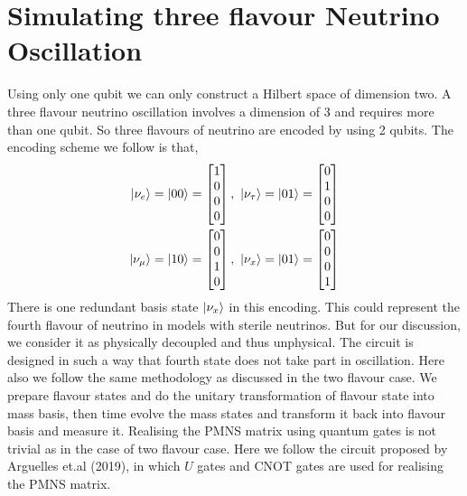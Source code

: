 \documentclass[12pt,a4paper]{report}
\begin{document}
\section{Simulating three flavour Neutrino Oscillation}\label{3FO}
Using only one qubit we can only construct a Hilbert space of dimension two. A three flavour neutrino oscillation involves a dimension of 3 and requires more than one qubit. So three flavours of neutrino are encoded by using 2 qubits. The encoding scheme we follow is that,
\begin{equation}
\label{eq:17}
\begin{split}
\ket{\nu_{e}}& = \ket{00} = \begin{bmatrix} 1\\0\\0\\0 \end{bmatrix}, \ \ket{\nu_{\tau}} = \ket{01} = \begin{bmatrix} 0\\1\\0\\0 \end{bmatrix} \\
\ket{\nu_{\mu}}&=\ket{10}=\begin{bmatrix} 0\\0\\1\\0 \end{bmatrix}, \ \ket{\nu_{x}} = \ket{01} = \begin{bmatrix} 0\\0\\0\\1 \end{bmatrix} 
\end{split}
\end{equation}
There is one redundant basis state  $\ket{\nu_{x}}$ in this encoding. This could represent the fourth flavour of neutrino in models with sterile neutrinos. But for our discussion, we consider it as physically decoupled and thus unphysical. The circuit is designed in such a way that fourth state does not take part in oscillation. Here also we follow the same methodology as discussed in the two flavour case. We prepare flavour states and do the unitary transformation of flavour state into mass basis, then time evolve the mass states and transform it back into flavour basis and measure it. Realising the PMNS matrix using quantum gates is not trivial as in the case of two flavour case. Here we follow the circuit proposed by Arguelles et.al (2019)\cite{jones}, in which $U$ gates and CNOT gates are used for realising the PMNS matrix. 
\end{document}
